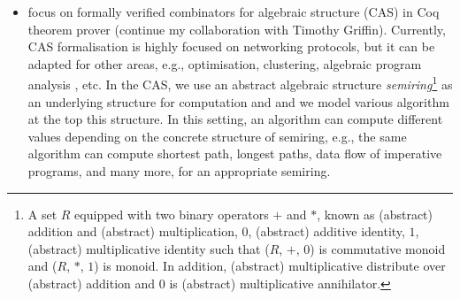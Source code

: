\documentclass[a4paper]{article}
\begin{document}
\begin{itemize}
\item focus on formally verified combinators for algebraic structure (CAS) in Coq theorem prover 
	(continue my collaboration with Timothy Griffin). 
	Currently, CAS formalisation is highly focused on networking protocols, but it can be 
	adapted for other areas, e.g., optimisation, clustering, algebraic program 
	analysis , etc. In the CAS, we use an abstract algebraic structure 
	\emph{semiring}\footnote{A set $R$ equipped with two binary operators $+$ and $*$, 
	known as (abstract) addition and (abstract) multiplication, $0$, (abstract) additive identity, 
	$1$, (abstract) multiplicative identity such that 
	($R$, $+$, $0$) is commutative monoid and ($R$, $*$, $1$) is monoid. 
	In addition, (abstract) multiplicative distribute over (abstract)  addition and 
	$0$ is (abstract) multiplicative annihilator.} as an underlying structure
	for computation and and we model various algorithm at the top this 
	structure. In this setting, an algorithm can compute different values depending 
	on the concrete structure of semiring, e.g., the same algorithm 
	can compute shortest path, longest paths, 
	data flow of imperative programs, and many more, \cite{gondran2008graphs} 
	for an appropriate semiring.
	

\end{itemize}



 

\end{document}
